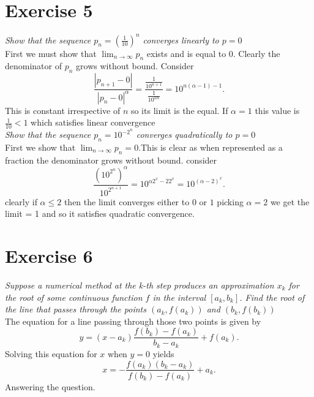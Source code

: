 \documentclass{amsart}
\begin{document}
    \section{Exercise 5}
    \emph{Show that the sequence $p_n = (\frac{1}{10})^{n}$ converges linearly to $p = 0$}\\
    First we must show that $\lim_{n\to \infty}p_n$ exists and is equal to $0$. Clearly the denominator of  $p_n$ grows without bound.
    Consider 
    \[
        \frac{|p_{n+1} - 0|}{|p_n-0|^{\alpha}} = \frac{\frac{1}{10^{n+1}}}{\frac{1}{10^{\alpha n}}} = 10^{n(\alpha-1)-1}
    .\] 
    This is constant irrespective of $n$ so its limit is the equal.
    If $\alpha = 1$ this value is $\frac{1}{10} < 1$ which satisfies linear convergence \\
    \emph{Show that the sequence $p_n = 10^{-2^{n}}$ converges quadratically to $p = 0$}\\
    First we show that $\lim_{n\to \infty} p_n = 0$.This is clear as when represented as a fraction the denominator grows without bound.
    consider
    \[
        \frac{(10^{2^{n}})^\alpha}{10^{2^{n+1}}} = 10^{\alpha 2^{x} - 2 2^{x}} = 10^{(\alpha-2)^{x}}
    .\] 
    clearly if $\alpha \le 2$ then the limit converges either to $0$ or $1$ picking  $\alpha = 2$ we get the limit = 1 and so it satisfies quadratic convergence.

    \section{Exercise 6}
    \emph{Suppose a numerical method at the k-th step produces an approximation $x_k$ for the root of some 
        continuous function $f$ in the interval $[a_k,b_k]$. Find the root of the line that passes through
    the points $(a_k,f(a_k))$ and $(b_k, f(b_k))$ }\\
        The equation for a line passing through those two points is given by
        \[
        y = (x-a_k) \frac{f(b_k)-f(a_k)}{b_k-a_k} + f(a_k)
        .\] 
        Solving this equation for $x$ when $y = 0$ yields
        \[
        x = -\frac{f(a_k)(b_k-a_k)}{f(b_k) - f(a_k)} + a_k
        .\] 
        Answering the question.
\end{document}
